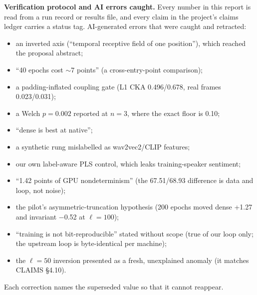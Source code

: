 \documentclass[lettersize,journal]{IEEEtran}
\begin{document}
\textbf{Verification protocol and AI errors caught.} Every number in this report is read from a run record or results file, and every claim in the project's claims ledger carries a status tag. AI-generated errors that were caught and retracted:
\begin{itemize}
\item an inverted axis (``temporal receptive field of one position''), which reached the proposal abstract;
\item ``40 epochs cost $\sim$7 points'' (a cross-entry-point comparison);
\item a padding-inflated coupling gate (L1 CKA 0.496/0.678, real frames 0.023/0.031);
\item a Welch $p=0.002$ reported at $n=3$, where the exact floor is 0.10;
\item ``dense is best at native'';
\item a synthetic rung mislabelled as wav2vec2/CLIP features;
\item our own label-aware PLS control, which leaks training-speaker sentiment;
\item ``1.42 points of GPU nondeterminism'' (the 67.51/68.93 difference is data and loop, not noise);
\item the pilot's asymmetric-truncation hypothesis (200 epochs moved dense +1.27 and invariant $-$0.52 at $\ell=100$);
\item ``training is not bit-reproducible'' stated without scope (true of our loop only; the upstream loop is byte-identical per machine);
\item the $\ell=50$ inversion presented as a fresh, unexplained anomaly (it matches CLAIMS \S4.10).
\end{itemize}
Each correction names the superseded value so that it cannot reappear.
\end{document}
